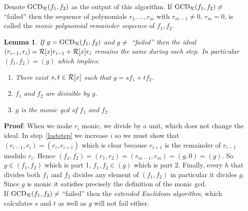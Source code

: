 \documentclass[10pt]{article}
\newtheorem{lemma}{Lemma}
\newcommand{\EuclAlg}{{\rm GCD}}
\begin{document}
Denote $\EuclAlg_{\cal R}(f_1,f_2)$ as the output of this algorithm.
If $\EuclAlg_{\cal R}(f_1,f_2) \neq$ ``failed'' then
the sequence of polynomials $r_1,\ldots,r_m$ with $r_{m-1} \neq 0$, $r_m = 0$,
is called the {\em monic polynomial remainder sequence} of $f_1,f_2$.
\begin{lemma}
\label{st_exist}
If $g = \EuclAlg_{\cal R}(f_1,f_2)$
and $g \neq$ ``failed'' then the ideal
$(r_{i-1}, r_{i}) = {\cal R}[x]r_{i-1} + {\cal R}[x]r_{i}$
remains the same during each step.
In particular $(f_1,f_2) = (g)$ which implies:
\begin{enumerate}
\item There exist $s,t \in {\cal R}[x]$ such
      that $g = sf_1 + tf_2$.
\item $f_1$ and $f_2$ are divisible by $g$.
\item $g$ is the monic gcd of $f_1$ and $f_2$.
\end{enumerate}
\end{lemma}
{\bf Proof}: When we make $r_i$ monic, we divide by a unit, which does not
change the ideal. In step~\ref{laststep} we increase $i$ so we must show
that $(r_{i-1},r_i) = (r_i,r_{i+1})$ which is clear because $r_{i+1}$ is
the remainder of $r_{i-1}$ modulo $r_i$.
Hence $(f_1,f_2)=(r_1,r_2) = (r_{m-1},r_m) = (g,0) = (g)$. So $g \in (f_1,f_2)$
which is part 1, $f_1,f_2 \in (g)$ which is part 2. Finally, every $h$ that
divides both $f_1$ and $f_2$ divides any element of $(f_1,f_2)$ in particular
it divides $g$. Since $g$ is monic it satisfies precisely the definition
of the monic gcd. \\

 If $\EuclAlg_{\cal R}(f_1,f_2) \neq$ ``failed'' then the
{\em extended Euclidean algorithm}, which calculates $s$ and $t$ as well as $g$
will not fail either. \\
\end{document}
